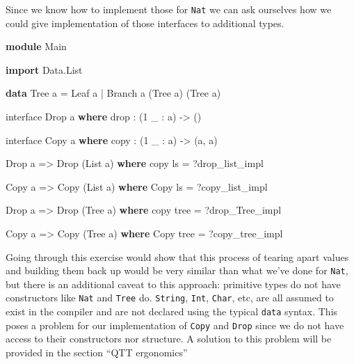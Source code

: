 \documentclass[
]{article}
\newenvironment{Shaded}{}{}
\newcommand{\DataTypeTok}[1]{\textcolor[rgb]{0.56,0.13,0.00}{#1}}
\newcommand{\DecValTok}[1]{\textcolor[rgb]{0.25,0.63,0.44}{#1}}
\newcommand{\FunctionTok}[1]{\textcolor[rgb]{0.02,0.16,0.49}{#1}}
\newcommand{\KeywordTok}[1]{\textcolor[rgb]{0.00,0.44,0.13}{\textbf{#1}}}
\newcommand{\NormalTok}[1]{#1}
\newcommand{\OperatorTok}[1]{\textcolor[rgb]{0.40,0.40,0.40}{#1}}
\newcommand{\OtherTok}[1]{\textcolor[rgb]{0.00,0.44,0.13}{#1}}
\begin{document}
Since we know how to implement those for \texttt{Nat} we can ask
ourselves how we could give implementation of those interfaces to
additional types.

\begin{Shaded}
\begin{Highlighting}[]
\KeywordTok{module} \DataTypeTok{Main}

\KeywordTok{import} \DataTypeTok{Data.List}

\KeywordTok{data} \DataTypeTok{Tree}\NormalTok{ a }\OtherTok{=} \DataTypeTok{Leaf}\NormalTok{ a }\OperatorTok{|} \DataTypeTok{Branch}\NormalTok{ a (}\DataTypeTok{Tree}\NormalTok{ a) (}\DataTypeTok{Tree}\NormalTok{ a)}

\NormalTok{interface }\DataTypeTok{Drop}\NormalTok{ a }\KeywordTok{where}
    \FunctionTok{drop} \OperatorTok{:}\NormalTok{ (}\DecValTok{1}\NormalTok{ \_ }\OperatorTok{:}\NormalTok{ a) }\OtherTok{{-}\textgreater{}}\NormalTok{ ()}

\NormalTok{interface }\DataTypeTok{Copy}\NormalTok{ a }\KeywordTok{where}
\NormalTok{    copy }\OperatorTok{:}\NormalTok{ (}\DecValTok{1}\NormalTok{ \_ }\OperatorTok{:}\NormalTok{ a) }\OtherTok{{-}\textgreater{}}\NormalTok{ (a, a)}

\DataTypeTok{Drop}\NormalTok{ a }\OtherTok{=\textgreater{}} \DataTypeTok{Drop}\NormalTok{ (}\DataTypeTok{List}\NormalTok{ a) }\KeywordTok{where}
\NormalTok{    copy ls }\OtherTok{=} \OperatorTok{?}\NormalTok{drop\_list\_impl}

\DataTypeTok{Copy}\NormalTok{ a }\OtherTok{=\textgreater{}} \DataTypeTok{Copy}\NormalTok{ (}\DataTypeTok{List}\NormalTok{ a) }\KeywordTok{where}
    \DataTypeTok{Copy}\NormalTok{ ls }\OtherTok{=} \OperatorTok{?}\NormalTok{copy\_list\_impl}

\DataTypeTok{Drop}\NormalTok{ a }\OtherTok{=\textgreater{}} \DataTypeTok{Drop}\NormalTok{ (}\DataTypeTok{Tree}\NormalTok{ a) }\KeywordTok{where}
\NormalTok{    copy tree }\OtherTok{=} \OperatorTok{?}\NormalTok{drop\_Tree\_impl}

\DataTypeTok{Copy}\NormalTok{ a }\OtherTok{=\textgreater{}} \DataTypeTok{Copy}\NormalTok{ (}\DataTypeTok{Tree}\NormalTok{ a) }\KeywordTok{where}
    \DataTypeTok{Copy}\NormalTok{ tree }\OtherTok{=} \OperatorTok{?}\NormalTok{copy\_tree\_impl}
\end{Highlighting}
\end{Shaded}

Going through this exercise would show that this process of tearing
apart values and building them back up would be very similar than what
we've done for \texttt{Nat}, but there is an additional caveat to this
approach: primitive types do not have constructors like \texttt{Nat} and
\texttt{Tree} do. \texttt{String}, \texttt{Int}, \texttt{Char}, etc, are
all assumed to exist in the compiler and are not declared using the
typical \texttt{data} syntax. This poses a problem for our
implementation of \texttt{Copy} and \texttt{Drop} since we do not have
access to their constructors nor structure. A solution to this problem
will be provided in the section ``QTT ergonomics''
\end{document}
